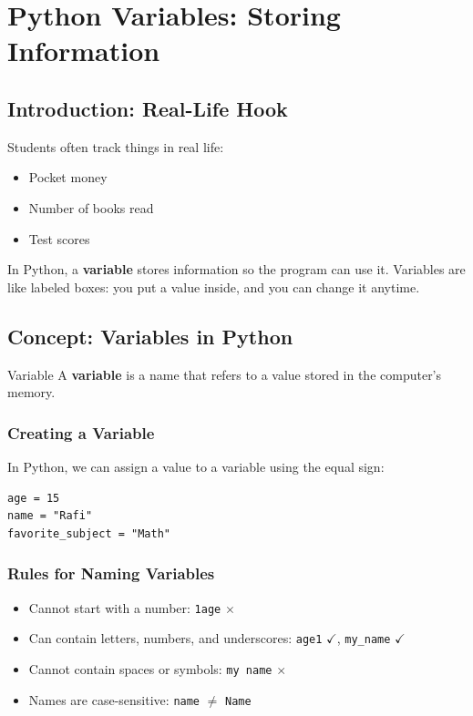 \chapter{Python Variables: Storing Information}

\section{Introduction: Real-Life Hook}

Students often track things in real life:  

\begin{itemize}
    \item Pocket money  
    \item Number of books read  
    \item Test scores  
\end{itemize}

In Python, a \textbf{variable} stores information so the program can use it. Variables are like labeled boxes: you put a value inside, and you can change it anytime.

\section{Concept: Variables in Python}

\begin{definition}{Variable}
A \textbf{variable} is a name that refers to a value stored in the computer’s memory. 
\end{definition}

\subsection{Creating a Variable}

In Python, we can assign a value to a variable using the equal sign:

\begin{verbatim}
age = 15
name = "Rafi"
favorite_subject = "Math"
\end{verbatim}

\subsection{Rules for Naming Variables}

\begin{itemize}
    \item Cannot start with a number: \texttt{1age} $\times$  
    \item Can contain letters, numbers, and underscores: \texttt{age1} $\checkmark$, \texttt{my\_name} $\checkmark$  
    \item Cannot contain spaces or symbols: \texttt{my name} $\times$  
    \item Names are case-sensitive: \texttt{name} $\neq$ \texttt{Name}  
\end{itemize}


